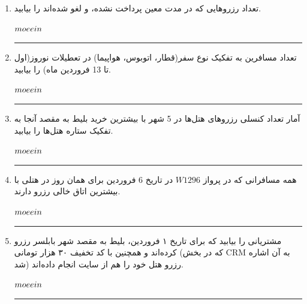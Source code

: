 \documentclass[12pt]{exam}
\begin{document}
\begin{enumerate}
	\item
تعداد رزروهایی که در مدت معین پرداخت نشده، و لغو شده‌اند را بیابید.

\setLTR
$moeein\\$
\setRTL
\rule{\linewidth}{0.05mm}




	\item
تعداد مسافرین به تفکیک نوع سفر(قطار، اتوبوس، هواپیما) در تعطیلات نوروز(اول تا 13 فروردین ماه) را بیابید.

\setLTR
$moeein\\$
\setRTL
\rule{\linewidth}{0.05mm}



	
	\item
	 آمار تعداد کنسلی رزروهای هتل‌ها در 5 شهر با بیشترین خرید بلیط به مقصد آنجا به‌ تفکیک ستاره هتل‌ها را بیابید.
	  
\setLTR
$moeein\\$
\setRTL
\rule{\linewidth}{0.05mm}	 
	 
	 
	
	\item
	 همه مسافرانی که در پرواز $W1296$ در تاریخ 6 فروردین برای همان روز در هتلی با بیشترین اتاق خالی رزرو دارند.
	
\setLTR
$moeein\\$
\setRTL
\rule{\linewidth}{0.05mm}
	
	
	
	\item
	 مشتریانی را بیابید که برای تاریخ ۱ فروردین، بلیط به مقصد شهر بابلسر رزرو کرده‌اند و همچنین \linebreak با کد تخفیف ۳۰ هزار تومانی (که در بخش CRM به‌ آن اشاره شد) رزرو هتل خود را هم از سایت انجام داده‌اند.
	 
\setLTR
$moeein\\$
\setRTL
\rule{\linewidth}{0.05mm}	 
	 
	 
	
\end{enumerate}
\end{document}
